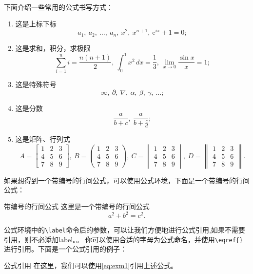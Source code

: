 下面介绍一些常用的公式书写方式：
\begin{enumerate}
\item 这是上标下标
$$a_1,\ a_2,\ \ldots,\ a_n, \ x^2,\ x^{n+1},\ \mathrm{e}^{i\pi} + 1 = 0;$$

\item 这是求和，积分，求极限
$$\sum_{i=1}^n i = \frac{n(n+1)}{2}, \
\int_0^1 x^2\, dx = \frac{1}{3},\
\lim_{x \to 0} \frac{\sin x}{x} = 1;$$

\item  这是特殊符号
$$\infty,\ \partial,\ \nabla,\ \alpha,\ \beta,\ \gamma,\ \ldots;$$

\item 这是分数
$$\frac{a}{b+c},\ \frac{a}{b+\frac{c}{d}};$$

\item 这是矩阵、行列式
$$
A = \begin{bmatrix}
1 & 2 & 3 \\
4 & 5 & 6 \\
7 & 8 & 9
\end{bmatrix},\ 
B = \begin{pmatrix}
1 & 2 & 3 \\
4 & 5 & 6 \\
7 & 8 & 9
\end{pmatrix},\ 
C = \begin{vmatrix}
1 & 2 & 3 \\
4 & 5 & 6 \\
7 & 8 & 9
\end{vmatrix},\ 
D = \begin{Vmatrix}
1 & 2 & 3 \\
4 & 5 & 6 \\
7 & 8 & 9
\end{Vmatrix}.
$$

\end{enumerate}


如果想得到一个带编号的行间公式，可以使用公式环境，下面是一个带编号的行间公式：
\begin{myexample}{带编号的行间公式}
这里是一个带编号的行间公式
\begin{equation}\label{eq:exm1}
    a^2+b^2=c^2.
\end{equation}
\end{myexample}

公式环境中的\verb|\label|命令后的参数，可以让我们方便地进行公式引用,如果不需要引用，则不必添加label。。
你可以使用合适的字母为公式命名，并使用\verb|\eqref{}|进行引用。下面是一个公式引用的例子：
\begin{myexample}{公式引用}
在这里，我们可以使用\eqref{eq:exm1}引用上述公式。
\end{myexample}

